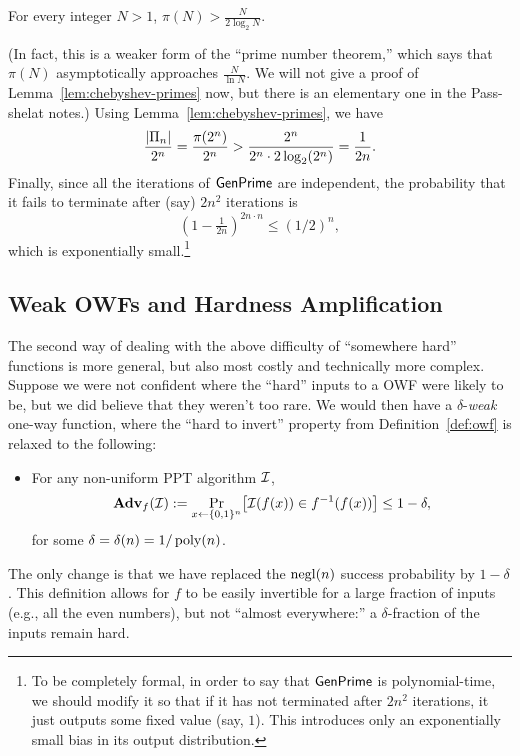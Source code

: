 \documentclass[11pt]{article}
\begin{document}
\begin{lemma}[Chebyshev]
  \label{lem:chebyshev-primes}
  For every integer $N > 1$, $\pi(N) > \frac{N}{2 \log_{2} N}$.
\end{lemma}
(In fact, this is a weaker form of the ``prime number theorem,'' which
says that $\pi(N)$ asymptotically approaches $\frac{N}{\ln N}$.  We
will not give a proof of Lemma~\ref{lem:chebyshev-primes} now, but
there is an elementary one in the Pass-shelat notes.)  Using
Lemma~\ref{lem:chebyshev-primes}, we have \[
\frac{\lvert\Pi_{n}\rvert}{2^{n}} = \frac{\pi(2^{n})}{2^{n}} >
\frac{2^{n}}{2^{n} \cdot 2 \log_{2}(2^{n})} = \frac{1}{2n}. \]
Finally, since all the iterations of $\mathsf{GenPrime}$ are
independent, the probability that it fails to terminate after (say)
$2n^{2}$ iterations is \[ (1-\tfrac{1}{2n})^{2n \cdot n} \leq
(1/2)^{n}, \] which is exponentially small.\footnote{To be completely
  formal, in order to say that $\mathsf{GenPrime}$ is polynomial-time,
  we should modify it so that if it has not terminated after $2n^{2}$
  iterations, it just outputs some fixed value (say, $1$).  This
  introduces only an exponentially small bias in its output
  distribution.}

\subsection{Weak OWFs and Hardness Amplification}
\label{sec:hardn-ampl}

The second way of dealing with the above difficulty of ``somewhere
hard'' functions is more general, but also most costly and technically
more complex.  Suppose we were not confident where the ``hard'' inputs
to a OWF were likely to be, but we did believe that they weren't too
rare.  We would then have a $\delta$-\emph{weak} one-way function,
where the ``hard to invert'' property from Definition~\ref{def:owf} is
relaxed to the following:
\begin{itemize}
\item For any non-uniform PPT algorithm $\mathcal{I}$, \[ \advan_{f}(\Inv) :=
  \Pr_{x \gets \bit^{n}} \bracks*{\Inv(f(x)) \in f^{-1}(f(x))} \leq
  1-\delta, \] for some $\delta = \delta(n) = 1/\operatorname{poly}(n)$.
\end{itemize}
The only change is that we have replaced the $\operatorname{negl}(n)$ success
probability by $1-\delta$.  This definition allows for $f$ to be
easily invertible for a large fraction of inputs (e.g., all the even
numbers), but not ``almost everywhere:'' a $\delta$-fraction of the
inputs remain hard.
\end{document}
